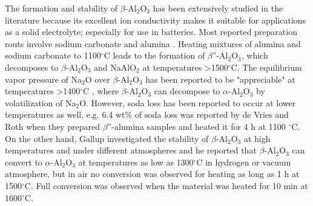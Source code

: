 The formation and stability of $\beta$-Al$_{2}$O$_{3}$ has been extensively studied in the literature because its excellent ion conductivity makes it suitable for applications as a solid electrolyte; especially for use in batteries. Most reported preparation routs involve sodium carbonate and alumina \cite{Vries1969,Kummer1972a,Ray1975}. Heating mixtures of alumina and sodium carbonate to 1100$^{\circ}$C leads to the formation of $\beta$''-Al$_{2}$O$_{3}$, which decomposes to $\beta$-Al$_{2}$O$_{3}$ and NaAlO$_{2}$ at temperatures >1500$^{\circ}$C. The equilibrium vapor pressure of Na$_{2}$O over $\beta$-Al$_{2}$O$_{3}$ has been reported to be "appreciable" at temperatures >1400$^{\circ}$C \cite{Kummer1972a}, where $\beta$-Al$_{2}$O$_{3}$ can decompose to $\alpha$-Al$_{2}$O$_{3}$ by volatilization of Na$_{2}$O. However, soda loss has been reported to occur at lower temperatures as well, e.g. 6.4 wt\% of soda loss was reported by de Vries and Roth \cite{Vries1969} when they prepared $\beta$''-alumina samples and heated it for 4 h at 1100 $^{\circ}$C. On the other hand, Gallup \cite{Gallup1935} investigated the stability of $\beta$-Al$_{2}$O$_{3}$ at high temperatures and under different atmospheres and he reported that $\beta$-Al$_{2}$O$_{3}$ can convert to $\alpha$-Al$_{2}$O$_{3}$ at temperatures as low as 1300$^{\circ}$C in hydrogen or vacuum atmosphere, but in air no conversion was observed for heating as long as 1 h at 1500$^{\circ}$C. Full conversion was observed when the material was heated for 10 min at 1600$^{\circ}$C.

